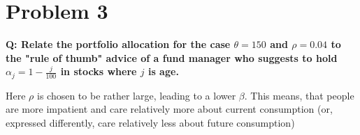 \documentclass[12pt,a4paper]{article}
\begin{document}
\section*{Problem 3}
\textbf{Q: Relate the portfolio allocation for the case $\theta = 150$ and $\rho = 0.04$ to the "rule of thumb" advice of a fund manager who suggests to hold $\alpha_j = 1- \frac{j}{100}$ in stocks where $j$ is age.}

Here $\rho$ is chosen to be rather large, leading to a lower $\beta$. This means, that people are more impatient and care relatively more about current consumption (or, expressed differently, care relatively less about future consumption)
\end{document}
